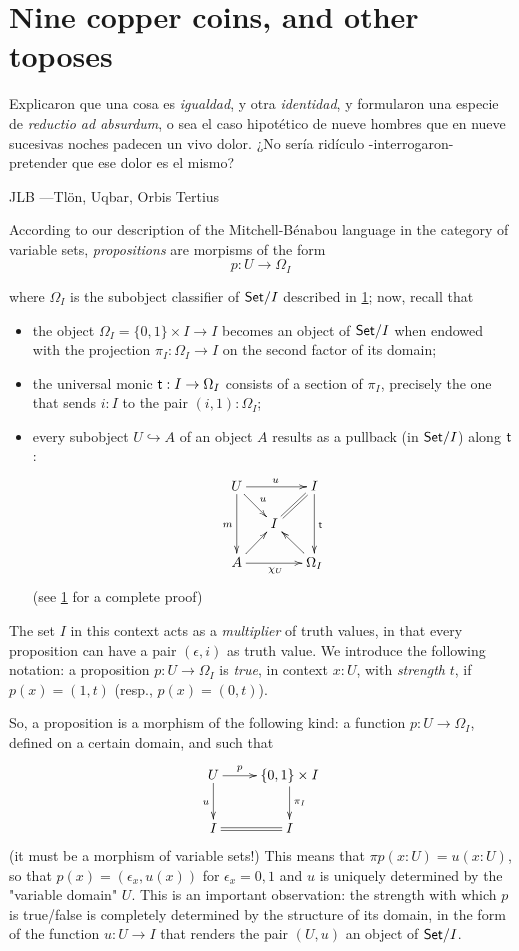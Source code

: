 \section{Nine copper coins, and other toposes}
\epigraph{
  Explicaron que una cosa es \emph{igualdad}, y otra \emph{identidad}, y formularon una especie de \emph{reductio ad absurdum}, o sea el caso hipotético de nueve hombres que en nueve sucesivas noches padecen un vivo dolor. ¿No sería ridículo -interrogaron- pretender que ese dolor es el mismo?
  }{JLB ---Tl\"on, Uqbar, Orbis Tertius}

According to our description of the Mitchell-Bénabou language in the category of variable sets, \emph{propositions} are morpisms of the form
\[p : U \to \Omega_I\]

where $\Omega_I$ is the subobject classifier of $\mathsf{Set}/I$ described in \ref{}; now, recall that
\begin{itemize}
  \item the object $\Omega_I = \{0,1\}\times I \to I$ becomes an object of $\mathsf{Set}/I$ when endowed with the projection $\pi_I : \Omega_I \to I$ on the second factor of its domain;
  \item the universal monic $\textsf{t} : I \to \Omega_I$ consists of a section of $\pi_I$, precisely the one that sends $i : I$ to the pair $(i,1) : \Omega_I$;
  \item every subobject $U \hookrightarrow A$ of an object $A$ results as a pullback (in $\mathsf{Set}/I$) along $\textsf{t}$:
        \[\xymatrix@R=5mm@C=5mm{
          U\ar[dr]^u\ar[rr]^u\ar[dd]_m&& I\ar[dd]^{\tr} \ar@{=}[dl]\\
          &I& \\
          A \ar[ur]\ar[rr]_{\chi_U}&& \ar[ul]\Omega_I
        }\]
        (see \ref{} for a complete proof)
\end{itemize}
The set $I$ in this context acts as a \emph{multiplier} of truth values, in that every proposition can have a pair $(\epsilon, i)$ as truth value. We introduce the following notation: a proposition $p : U \to \Omega_I$ is \emph{true}, in context $x :U$, with \emph{strength} $t$, if $p(x) =(1,t)$ (resp., $p(x)=(0,t)$).

So, a proposition is a morphism of the following kind: a function $p : U \to \Omega_I$, defined on a certain domain, and such that
\[
\xymatrix{
  U\ar[d]_u\ar[r]^-p  & \{0,1\}\times I \ar[d]^{\pi_I}\\ 
  I \ar@{=}[r]& I
}  
\]
(it must be a morphism of variable sets!) This means that $\pi p(x : U) = u(x : U)$, so that $p(x) = (\epsilon_x, u(x))$ for $\epsilon_x =0,1$ and $u$ is uniquely determined by the "variable domain" $U$. This is an important observation: the strength with which $p$ is true/false is completely determined by the structure of its domain, in the form of the function $u : U \to I$ that renders the pair $(U,u)$ an object of $\mathsf{Set}/I$.


